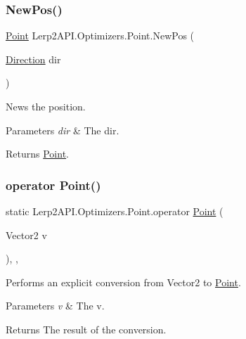 \subsubsection{\texorpdfstring{New\+Pos()}{NewPos()}}
{\footnotesize\ttfamily \hyperlink{struct_lerp2_a_p_i_1_1_optimizers_1_1_point}{Point} Lerp2\+A\+P\+I.\+Optimizers.\+Point.\+New\+Pos (\begin{DoxyParamCaption}\item[{\hyperlink{namespace_lerp2_a_p_i_1_1_optimizers_a159a6f85bec1076b8b34d5da86c7cafe}{Direction}}]{dir }\end{DoxyParamCaption})\hspace{0.3cm}{\ttfamily [inline]}}



News the position. 


\begin{DoxyParams}{Parameters}
{\em dir} & The dir.\\
\hline
\end{DoxyParams}
\begin{DoxyReturn}{Returns}
\hyperlink{struct_lerp2_a_p_i_1_1_optimizers_1_1_point}{Point}.
\end{DoxyReturn}
\mbox{\label{struct_lerp2_a_p_i_1_1_optimizers_1_1_point_ab36715b8d85d310ff9dee651fdddaf31}} 
\subsubsection{\texorpdfstring{operator Point()}{operator Point()}}
{\footnotesize\ttfamily static Lerp2\+A\+P\+I.\+Optimizers.\+Point.\+operator \hyperlink{struct_lerp2_a_p_i_1_1_optimizers_1_1_point}{Point} (\begin{DoxyParamCaption}\item[{Vector2}]{v }\end{DoxyParamCaption})\hspace{0.3cm}{\ttfamily [inline]}, {\ttfamily [explicit]}, {\ttfamily [static]}}



Performs an explicit conversion from Vector2 to \hyperlink{struct_lerp2_a_p_i_1_1_optimizers_1_1_point}{Point}. 


\begin{DoxyParams}{Parameters}
{\em v} & The v.\\
\hline
\end{DoxyParams}
\begin{DoxyReturn}{Returns}
The result of the conversion.
\end{DoxyReturn}
\mbox{\label{struct_lerp2_a_p_i_1_1_optimizers_1_1_point_a1ee49d81f587872a75d81c7193f10e00}} 
